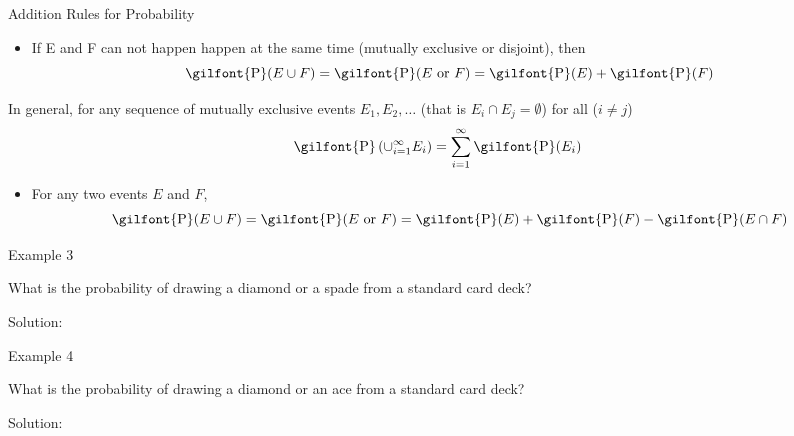 \documentclass[
  ignorenonframetext,
]{beamer}
\providecommand{\tightlist}{%
  \setlength{\itemsep}{0pt}\setlength{\parskip}{0pt}}
\begin{document}
\begin{frame}{Addition Rules for Probability}
\label{addition-rules-for-probability}
\begin{itemize}
\tightlist
\item
  If E and F can not happen happen at the same time (mutually exclusive
  or disjoint), then
  \[\textrm{\gilfont{P}}\normalfont (E \cup F)=\textrm{\gilfont{P}}\normalfont (E \text{ or } F) = \textrm{\gilfont{P}}\normalfont (E)+ \textrm{\gilfont{P}}\normalfont (F)\]
\end{itemize}

In general, for any sequence of mutually exclusive events
\(E_1, E_2, \ldots\) (that is \(E_i \cap E_j = \emptyset\)) for all
(\(i\neq j\))
\[\textrm{\gilfont{P}}\normalfont \left(\cup_{i=1}^{\infty} E_i\right)=\sum_{i=1}^{\infty} \textrm{\gilfont{P}}\normalfont (E_i)\]

\begin{itemize}
\tightlist
\item
  For any two events \(E\) and \(F\),
  \[\textrm{\gilfont{P}}\normalfont (E \cup F)=\textrm{\gilfont{P}}\normalfont (E \text{ or } F)=\textrm{\gilfont{P}}\normalfont (E)+ \textrm{\gilfont{P}}\normalfont (F)-\textrm{\gilfont{P}}\normalfont (E\cap F)\]
\end{itemize}
\end{frame}

\begin{frame}{Example 3}
\label{example-3}
\begin{tcolorbox}
What is the probability of drawing a diamond or a spade from a standard card deck?
\end{tcolorbox}

\begin{tcolorbox}
Solution:

\vspace{30mm}
\end{tcolorbox}
\end{frame}

\begin{frame}{Example 4}
\label{example-4}
\begin{tcolorbox}
What is the probability of drawing a diamond or an ace from a standard card deck?
\end{tcolorbox}

\begin{tcolorbox}
Solution:

\vspace{30mm}
\end{tcolorbox}
\end{frame}
\end{document}
